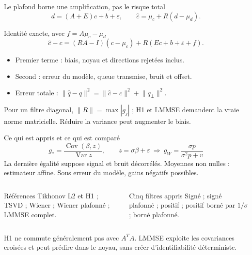 \documentclass[aspectratio=169,10pt]{beamer}
\newcommand{\norm}[1]{\lVert#1\rVert}
\begin{document}
\begin{frame}{Le plafond borne une amplification, pas le risque total}
\[
d=(A+E)c+b+\varepsilon,\qquad \widehat c=\mu_c+R(d-\mu_d).
\]
\begin{block}{Identité exacte, avec $f=A\mu_c-\mu_d$}
\[
\widehat c-c=(RA-I)(c-\mu_c)+R(Ec+b+\varepsilon+f).
\]
\end{block}
\begin{itemize}
\item Premier terme : biais, noyau et directions rejetées inclus.
\item Second : erreur du modèle, queue transmise, bruit et offset.
\item Erreur totale : $\norm{\widehat q-q}^2=\norm{\widehat c-c}^2+\norm{q_\perp}^2$.
\end{itemize}
\small Pour un filtre diagonal, $\norm R=\max|g_j|$ ; H1 et LMMSE demandent la vraie norme matricielle. Réduire la variance peut augmenter le biais.
\end{frame}

\begin{frame}{Ce qui est appris et ce qui est comparé}
\[
g_* =\frac{\operatorname{Cov}(\beta,z)}{\operatorname{Var}z},\qquad
z=\sigma\beta+\varepsilon\ \Longrightarrow\ g_W=\frac{\sigma p}{\sigma^2p+v}
\]
\small La dernière égalité suppose signal et bruit décorrélés. Moyennes non nulles : estimateur affine. Sous erreur du modèle, gains négatifs possibles.
\begin{columns}[T]
\begin{block}{Références}
Tikhonov L2 et H1 ; TSVD ; Wiener ; Wiener plafonné ; LMMSE complet.
\end{block}
\begin{block}{Cinq filtres appris}
Signé ; signé plafonné ; positif ; positif borné par $1/\sigma$ ; borné plafonné.
\end{block}
\end{columns}
\small H1 ne commute généralement pas avec $A^TA$. LMMSE exploite les covariances croisées et peut prédire dans le noyau, sans créer d'identifiabilité déterministe.
\end{frame}
\end{document}
